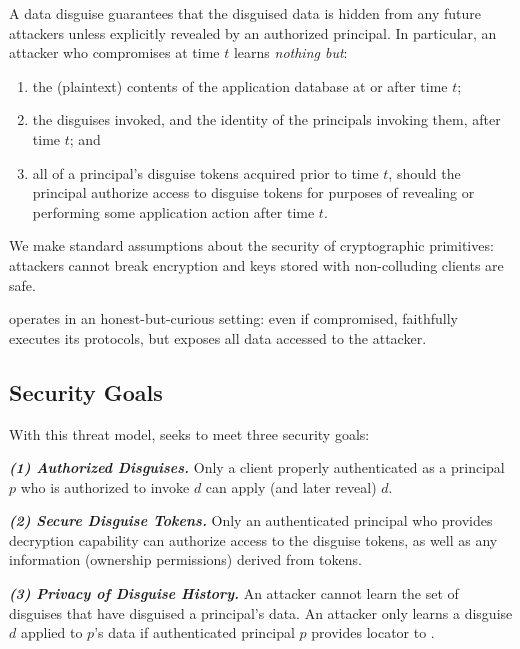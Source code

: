 %
A data disguise guarantees that the disguised data is hidden from any future attackers unless
explicitly revealed by an authorized principal.
%
In particular, an attacker who compromises \sys at time $t$ learns \emph{nothing but}:
\begin{enumerate}[nosep]
  \item the (plaintext) contents of the application database at or after time $t$;
  \item the disguises invoked, and the identity of the principals invoking them, after time $t$; and 
  \item all of a principal's disguise tokens acquired prior to time $t$, should the principal authorize access to
      disguise tokens for purposes of revealing or performing some application action after time $t$.
\end{enumerate}
%
We make standard assumptions about the security of cryptographic primitives: attackers cannot
break encryption and keys stored with non-colluding clients are safe.
%

%
\sys operates in an honest-but-curious setting: even if compromised, \sys faithfully executes
its protocols, but exposes all data accessed to the attacker.
%

\subsection{Security Goals}
%
With this threat model, \sys seeks to meet three security goals:
%

%
\vspace{6pt}\noindent\textbf{\emph{(1) Authorized Disguises.}}
%
Only a client properly authenticated as a principal $p$ who is authorized to invoke $d$ can apply
(and later reveal) $d$.
%

\vspace{6pt}\noindent\textbf{\emph{(2) Secure Disguise Tokens.}}
%
Only an authenticated principal who provides decryption capability
 can authorize access to the disguise tokens, as well as any information
(\eg ownership permissions) derived from tokens.
%

\vspace{6pt}\noindent\textbf{\emph{(3) Privacy of Disguise History.}}
%
An attacker cannot learn the set of disguises that have disguised a principal's data.
%
An attacker only learns a disguise $d$ applied to $p$'s data if authenticated principal $p$ provides
locator  to \sys.

